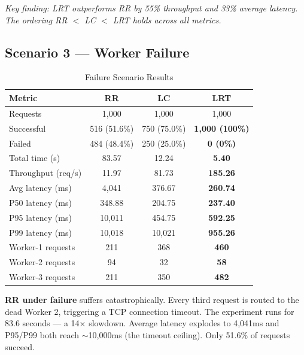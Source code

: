 \documentclass[conference]{IEEEtran}
\begin{document}
\textit{Key finding: LRT outperforms RR by 55\% throughput and 33\% average latency. The ordering RR $<$ LC $<$ LRT holds across all metrics.}

\subsection{Scenario 3 --- Worker Failure}

\begin{table}[h]
  \centering
  \caption{Failure Scenario Results}
  \begin{tabular}{lccc}
    \toprule
    \textbf{Metric} & \textbf{RR} & \textbf{LC} & \textbf{LRT} \\
    \midrule
    Requests           & 1,000          & 1,000         & 1,000            \\
    Successful         & 516 (51.6\%)   & 750 (75.0\%)  & \textbf{1,000 (100\%)} \\
    Failed             & 484 (48.4\%)   & 250 (25.0\%)  & \textbf{0 (0\%)} \\
    Total time (s)     & 83.57          & 12.24         & \textbf{5.40}    \\
    Throughput (req/s) & 11.97          & 81.73         & \textbf{185.26}  \\
    Avg latency (ms)   & 4,041          & 376.67        & \textbf{260.74}  \\
    P50 latency (ms)   & 348.88         & 204.75        & \textbf{237.40}  \\
    P95 latency (ms)   & 10,011         & 454.75        & \textbf{592.25}  \\
    P99 latency (ms)   & 10,018         & 10,021        & \textbf{955.26}  \\
    Worker-1 requests  & 211            & 368           & \textbf{460}     \\
    Worker-2 requests  & 94             & 32            & \textbf{58}      \\
    Worker-3 requests  & 211            & 350           & \textbf{482}     \\
    \bottomrule
  \end{tabular}
\end{table}

\textbf{RR under failure} suffers catastrophically. Every third request is routed to the dead Worker 2, triggering a TCP connection timeout. The experiment runs for 83.6 seconds --- a 14$\times$ slowdown. Average latency explodes to 4,041ms and P95/P99 both reach $\sim$10,000ms (the timeout ceiling). Only 51.6\% of requests succeed.
\end{document}
